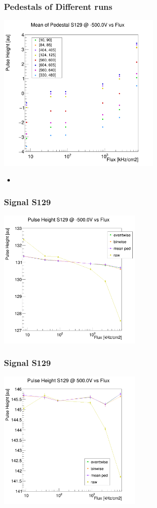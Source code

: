 \documentclass[9pt]{beamer}
\begin{document}
\begin{frame}
	\frametitle{Pedestals of Different runs}
	\begin{center}
		\includegraphics[width=8cm]{Pics/meanPedestals}
	\end{center}
	\begin{itemize}
		\item 
	\end{itemize}
\end{frame}
\begin{frame}
	\frametitle{Signal S129}
	\begin{center}
		\includegraphics[width=7cm]{Pics/sig129}
	\end{center}
\end{frame}
\begin{frame}
	\frametitle{Signal S129}
	\begin{center}
		\includegraphics[width=7cm]{Pics/sig129pos}
	\end{center}
\end{frame}
\end{document}
